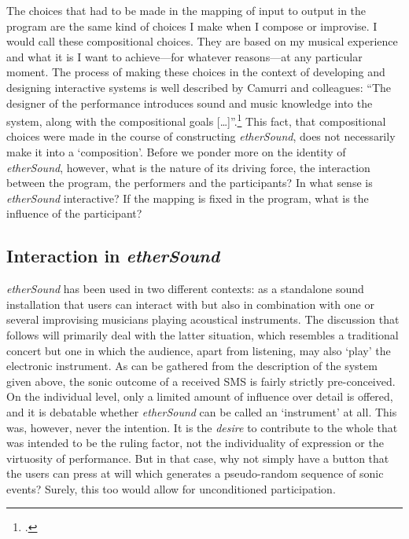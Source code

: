 The choices that had to be made in the mapping of input to output in the program are the same kind of choices I make when I compose or improvise. I would call these compositional choices. They are based on my musical experience and what it is I want to achieve---for whatever reasons---at any particular moment. The process of making these choices in the context of developing and designing interactive systems is well described by Camurri and colleagues: ``The designer of the performance introduces sound and music knowledge into the system, along with the compositional goals [\ldots]''.\footcite[Camurri, Richetti, and Trocca, 1999, as cited in][373]{rowe01} This fact, that compositional choices were made in the course of constructing \emph{etherSound}, does not necessarily make it into a `composition'. Before we ponder more on the identity of \emph{etherSound}, however, what is the nature of its driving force, the interaction between the program, the performers and the participants? In what sense is \emph{etherSound} interactive? If the mapping is fixed in the program, what is the influence of the participant? 

\subsection{Interaction in \emph{etherSound}}
\label{sec:inter-emph}

\emph{etherSound} has been used in two different contexts: as a standalone sound installation that users can interact with but also in combination with one or several improvising musicians playing acoustical instruments. The discussion that follows will primarily deal with the latter situation, which resembles a traditional concert but one in which the audience, apart from listening, may also `play' the electronic instrument. As can be gathered from the description of the system given above, the sonic outcome of a received SMS is fairly strictly pre-conceived. On the individual level, only a limited amount of influence over detail is offered, and it is debatable whether \emph{etherSound} can be called an `instrument' at all. 
This was, however, never the intention. It is the \emph{desire} to contribute to the whole that was intended to be the ruling factor, not the individuality of expression or the virtuosity of performance. But in that case, why not simply have a button that the users can press at will which generates a pseudo-random sequence of sonic events? Surely, this too would allow for unconditioned participation.
 
